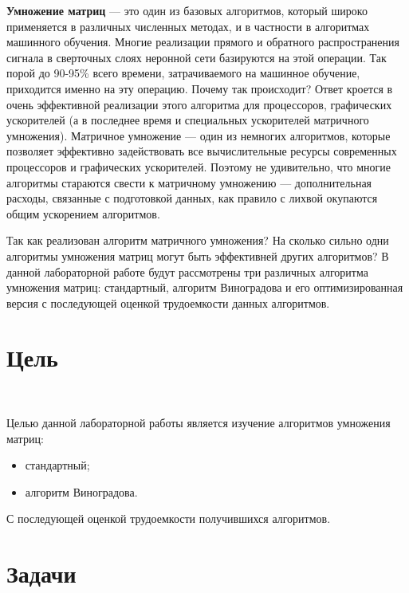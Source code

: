 \documentclass[12pt]{report}
\begin{document}
	
	 \vspace{0.5cm}
	 
	\textbf{Умножение матриц} — это один из базовых алгоритмов, который широко применяется в различных численных методах, и в частности в алгоритмах машинного обучения. Многие реализации прямого и обратного распространения сигнала в сверточных слоях неронной сети базируются на этой операции. Так порой до 90-95\% всего времени, затрачиваемого на машинное обучение, приходится именно на эту операцию. Почему так происходит? Ответ кроется в очень эффективной реализации этого алгоритма для процессоров, графических ускорителей (а в последнее время и специальных ускорителей матричного умножения). Матричное умножение — один из немногих алгоритмов, которые позволяет эффективно задействовать все вычислительные ресурсы современных процессоров и графических ускорителей. Поэтому не удивительно, что многие алгоритмы стараются свести к матричному умножению — дополнительная расходы, связанные с подготовкой данных, как правило с лихвой окупаются общим ускорением алгоритмов.
	
	Так как реализован алгоритм матричного умножения? На сколько сильно одни алгоритмы умножения матриц могут быть эффективней других алгоритмов? В данной лабораторной работе будут рассмотрены три различных алгоритма умножения матриц: стандартный, алгоритм Виноградова и его оптимизированная версия с последующей оценкой трудоемкости данных алгоритмов.
	
	\chapter{Цель}
	
	~\
	
	Целью данной лабораторной работы является изучение алгоритмов умножения матриц:
	\begin{itemize}
		\item стандартный;
		\item алгоритм Виноградова.
	\end{itemize}
	С последующей оценкой трудоемкости получившихся алгоритмов.
	
	\chapter{Задачи}
	
	~\
	
\end{document}
